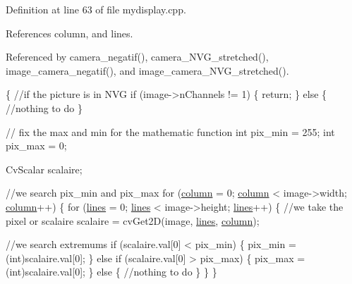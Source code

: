 Definition at line 63 of file mydisplay.\-cpp.



References column, and lines.



Referenced by camera\-\_\-negatif(), camera\-\_\-\-N\-V\-G\-\_\-stretched(), image\-\_\-camera\-\_\-negatif(), and image\-\_\-camera\-\_\-\-N\-V\-G\-\_\-stretched().


\begin{DoxyCode}
\{
    \textcolor{comment}{//if the picture is in NVG}
    \textcolor{keywordflow}{if} (image->nChannels != 1)
    \{
        \textcolor{keywordflow}{return};
    \}
    \textcolor{keywordflow}{else} \{
        \textcolor{comment}{//nothing to do}
    \}

    \textcolor{comment}{// fix the max and min for the mathematic function}
    \textcolor{keywordtype}{int} pix\_min = 255;
    \textcolor{keywordtype}{int} pix\_max = 0;

    CvScalar scalaire;

    \textcolor{comment}{//we search pix\_min and pix\_max}
    \textcolor{keywordflow}{for} (\hyperlink{classMyDisplay_a94a51f56cd8e8c5b6e22f5634b5d5f12}{column} = 0; \hyperlink{classMyDisplay_a94a51f56cd8e8c5b6e22f5634b5d5f12}{column} < image->width; \hyperlink{classMyDisplay_a94a51f56cd8e8c5b6e22f5634b5d5f12}{column}++)
    \{
        \textcolor{keywordflow}{for} (\hyperlink{classMyDisplay_a2cb48c4b915895b0bc7e7cd0f524a3be}{lines} = 0; \hyperlink{classMyDisplay_a2cb48c4b915895b0bc7e7cd0f524a3be}{lines} < image->height; \hyperlink{classMyDisplay_a2cb48c4b915895b0bc7e7cd0f524a3be}{lines}++)
        \{
            \textcolor{comment}{//we take the pixel or scalaire}
            scalaire = cvGet2D(image, \hyperlink{classMyDisplay_a2cb48c4b915895b0bc7e7cd0f524a3be}{lines}, \hyperlink{classMyDisplay_a94a51f56cd8e8c5b6e22f5634b5d5f12}{column});

            \textcolor{comment}{//we search extremums}
            \textcolor{keywordflow}{if} (scalaire.val[0] < pix\_min)
            \{
                pix\_min = (int)scalaire.val[0];
            \}
            \textcolor{keywordflow}{else} \textcolor{keywordflow}{if} (scalaire.val[0] > pix\_max)
            \{
                pix\_max = (int)scalaire.val[0];
            \}
            \textcolor{keywordflow}{else} \{
                \textcolor{comment}{//nothing to do}
            \}
        \}
    \}


\end{DoxyCode}
